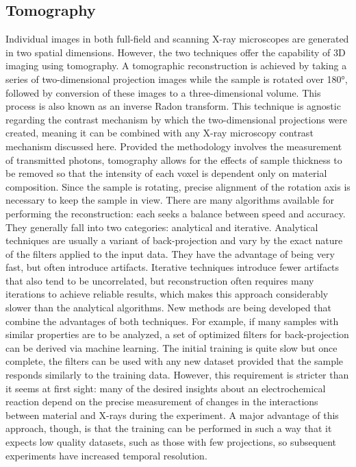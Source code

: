 \documentclass[journal=cmatex,manuscript=perspective]{achemso}
\begin{document}
\subsection{Tomography}

Individual images in both full-field and scanning X-ray microscopes
are generated in two spatial dimensions. However, the two techniques
offer the capability of 3D imaging using tomography. A tomographic
reconstruction is achieved by taking a series of two-dimensional
projection images while the sample is rotated over \ang{180}, followed
by conversion of these images to a three-dimensional volume. This
process is also known as an inverse Radon transform. This technique is
agnostic regarding the contrast mechanism by which the two-dimensional
projections were created, meaning it can be combined with any X-ray
microscopy contrast mechanism discussed here. Provided the methodology
involves the measurement of transmitted photons, tomography allows for
the effects of sample thickness to be removed so that the intensity of
each voxel is dependent only on material composition. Since the sample
is rotating, precise alignment of the rotation axis is necessary to
keep the sample in view. There are many algorithms available for
performing the reconstruction: each seeks a balance between speed and
accuracy. They generally fall into two categories: analytical and
iterative. Analytical techniques are usually a variant of
back-projection and vary by the exact nature of the filters applied to
the input data. They have the advantage of being very fast, but often
introduce artifacts. Iterative techniques introduce fewer artifacts
that also tend to be uncorrelated, but reconstruction often requires
many iterations to achieve reliable results, which makes this approach
considerably slower than the analytical algorithms. New methods are
being developed that combine the advantages of both techniques. For
example, if many samples with similar properties are to be analyzed, a
set of optimized filters for back-projection can be derived via
machine learning. The initial training is quite slow but once
complete, the filters can be used with any new dataset provided that
the sample responds similarly to the training
data\cite{pelt2013}. However, this requirement is stricter than it
seems at first sight: many of the desired insights about an
electrochemical reaction depend on the precise measurement of changes
in the interactions between material and X-rays during the
experiment. A major advantage of this approach, though, is that the
training can be performed in such a way that it expects low quality
datasets, such as those with few projections, so subsequent
experiments have increased temporal resolution.
\end{document}
